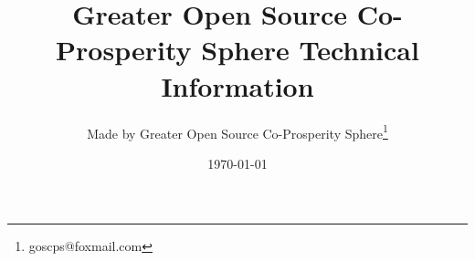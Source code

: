\documentclass[UTF-8,twoside,a4paper,draft,titlepage]{ctexbook}
\begin{document}
	\frontmatter
	
	\title{Greater Open Source Co-Prosperity Sphere Technical Information} 
	\author{Made by Greater Open Source Co-Prosperity Sphere\thanks{goscps@foxmail.com}}
	\date{\today}
	\maketitle
	
	\tableofcontents
	
	\mainmatter
	
	
	
	\backmatter
	
	
\end{document}
